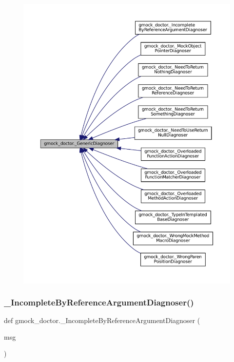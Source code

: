 \begin{figure}[H]
\begin{center}
\leavevmode
\includegraphics[width=350pt]{namespacegmock__doctor_af5023d3e12d1f4a7171c6b035783de84_icgraph}
\end{center}
\end{figure}
\mbox{\label{namespacegmock__doctor_a57b4c1486c344bd12e4138c588029c19}} 
\subsubsection{\texorpdfstring{\+\_\+\+Incomplete\+By\+Reference\+Argument\+Diagnoser()}{\_IncompleteByReferenceArgumentDiagnoser()}}
{\footnotesize\ttfamily def gmock\+\_\+doctor.\+\_\+\+Incomplete\+By\+Reference\+Argument\+Diagnoser (\begin{DoxyParamCaption}\item[{}]{msg }\end{DoxyParamCaption})\hspace{0.3cm}{\ttfamily [private]}}

